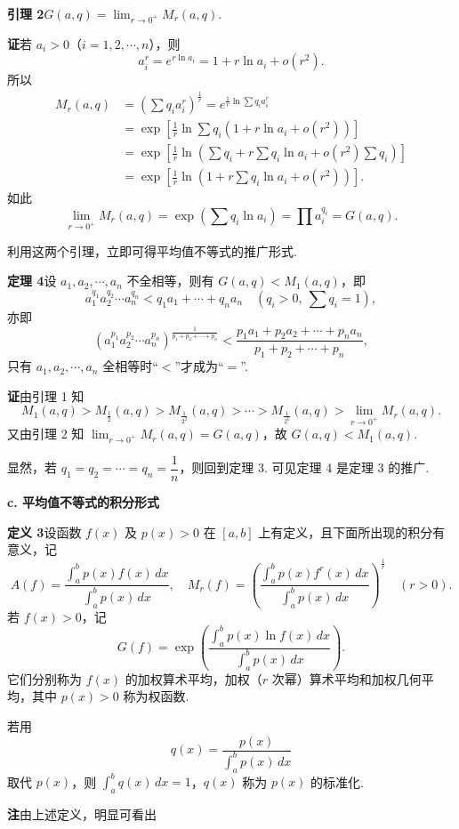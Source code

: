 \documentclass[UTF8, 12pt, fontset=fandol, oneside]{ctexart}
\begin{document}
\noindent\textbf{引理 2}\quad $G(a,q)=\displaystyle\lim_{r\to0^+}M_r(a,q)$.

\noindent\textbf{证}\quad 若 $a_i>0$（$i=1,2,\cdots,n$），则
\[
a_i^r=e^{r\ln a_i}=1+r\ln a_i+o(r^2).
\]
所以
\[
\begin{aligned}
M_r(a,q)
&=\left(\sum q_i a_i^r\right)^{\frac1r}
=e^{\frac1r\ln\sum q_i a_i^r}\\
&=\exp\left[\frac1r\ln\sum q_i(1+r\ln a_i+o(r^2))\right]\\
&=\exp\left[\frac1r\ln\left(\sum q_i+r\sum q_i\ln a_i+o(r^2)\sum q_i\right)\right]\\
&=\exp\left[\frac1r\ln\left(1+r\sum q_i\ln a_i+o(r^2)\right)\right].
\end{aligned}
\]
如此
\[
\lim_{r\to0^+}M_r(a,q)
=\exp\left(\sum q_i\ln a_i\right)=\prod a_i^{q_i}=G(a,q).
\]

利用这两个引理，立即可得平均值不等式的推广形式.

\noindent\textbf{定理 4}\quad 设 $a_1,a_2,\cdots,a_n$ 不全相等，则有 $G(a,q)<M_1(a,q)$，即
\[
a_1^{q_1}a_2^{q_2}\cdots a_n^{q_n}
<q_1a_1+\cdots+q_na_n\quad(q_i>0,\ \sum q_i=1),
\]
亦即
\[
(a_1^{p_1}a_2^{p_2}\cdots a_n^{p_n})^{\frac1{p_1+p_2+\cdots+p_n}}
<\frac{p_1a_1+p_2a_2+\cdots+p_na_n}{p_1+p_2+\cdots+p_n},
\]
只有 $a_1,a_2,\cdots,a_n$ 全相等时“$<$”才成为“$=$”.

\noindent\textbf{证}\quad 由引理 1 知
\[
M_1(a,q)>M_{\frac12}(a,q)>M_{\frac1{2^2}}(a,q)>\cdots>
M_{\frac1{2^k}}(a,q)>\lim_{r\to0^+}M_r(a,q).
\]
又由引理 2 知 $\displaystyle\lim_{r\to0^+}M_r(a,q)=G(a,q)$，故 $G(a,q)<M_1(a,q)$.

显然，若 $q_1=q_2=\cdots=q_n=\dfrac1n$，则回到定理 3. 可见定理 4 是定理 3 的推广.

\noindent\textbf{c. 平均值不等式的积分形式}

\noindent\textbf{定义 3}\quad 设函数 $f(x)$ 及 $p(x)>0$ 在 $[a,b]$ 上有定义，且下面所出现的积分有意义，记
\[
A(f)=\frac{\int_a^b p(x)f(x)\,dx}{\int_a^b p(x)\,dx},\quad
M_r(f)=\left(\frac{\int_a^b p(x)f^r(x)\,dx}{\int_a^b p(x)\,dx}\right)^{\frac1r}\quad(r>0).
\]
若 $f(x)>0$，记
\[
G(f)=\exp\left(\frac{\int_a^b p(x)\ln f(x)\,dx}{\int_a^b p(x)\,dx}\right).
\]
它们分别称为 $f(x)$ 的加权算术平均，加权（$r$ 次幂）算术平均和加权几何平均，其中 $p(x)>0$ 称为权函数.

若用
\[
q(x)=\frac{p(x)}{\int_a^b p(x)\,dx}
\]
取代 $p(x)$，则 $\displaystyle\int_a^b q(x)\,dx=1$，$q(x)$ 称为 $p(x)$ 的标准化.

\noindent\textbf{注}\quad 由上述定义，明显可看出
\end{document}
